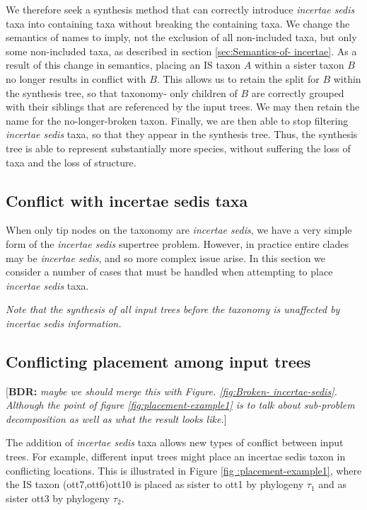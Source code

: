 \documentclass[english]{article}
\begin{document}
We therefore seek a synthesis method that can correctly introduce
\emph{incertae sedis} taxa into containing taxa without breaking the
containing taxa. We change the semantics of names to imply, not the
exclusion of all non-included taxa, but only some non-included taxa,
as described in section \ref{sec:Semantics-of- incertae}. As a result
of this change in semantics, placing an IS taxon $A$ within a sister
taxon $B$ no longer results in conflict with $B$. This allows us to
retain the split for $B$ within the synthesis tree, so that taxonomy-
only children of $B$ are correctly grouped with their siblings that
are referenced by the input trees. We may then retain the name for the
no-longer-broken taxon. Finally, we are then able to stop filtering
\emph{incertae sedis} taxa, so that they appear in the synthesis tree.
Thus, the synthesis tree is able to represent substantially more
species, without suffering the loss of taxa and the loss of structure.

\subsection{Conflict with incertae sedis taxa}

When only tip nodes on the taxonomy are \emph{incertae sedis}, we have
a very simple form of the \emph{incertae sedis} supertree problem.
However, in practice entire clades may be \emph{incertae sedis}, and
so more complex issue arise. In this section we consider a number of
cases that must be handled when attempting to place \emph{incertae
sedis} taxa.

\emph{Note that the synthesis of all input trees before the taxonomy
is unaffected by incertae sedis information.}

\subsection{Conflicting placement among input trees}

{[}\textbf{BDR:} \emph{maybe we should merge this with Figure.
\ref{fig:Broken- incertae-sedis}. Although the point of figure
\ref{fig:placement-example1} is to talk about sub-problem
decomposition as well as what the result looks like.}{]}

The addition of \emph{incertae sedis} taxa allows new types of
conflict between input trees. For example, different input trees might
place an incertae sedis taxon in conflicting locations. This is
illustrated in Figure \ref{fig :placement-example1}, where the IS
taxon (ott7,ott6)ott10 is placed as sister to ott1 by phylogeny
$\tau_{1}$ and as sister ott3 by phylogeny $\tau_{2}$.
\end{document}
